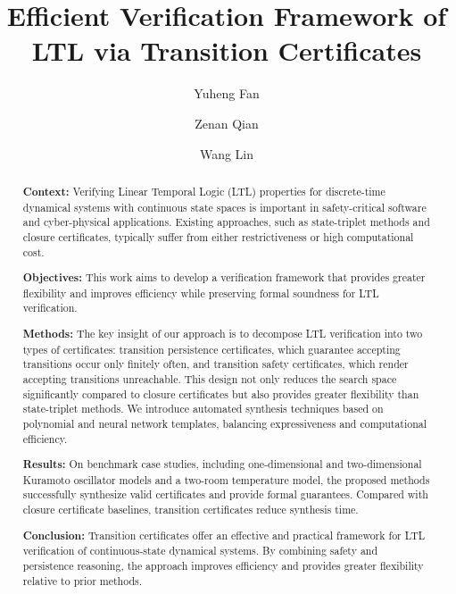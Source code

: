 ﻿\documentclass[a4paper,fleqn]{cas-sc}
\theoremstyle{definition}
\begin{document}
\let\WriteBookmarks\relax
\def\floatpagepagefraction{1}
\def\textpagefraction{.001}


\title[mode=title]{Efficient Verification Framework of LTL via Transition Certificates}

\author{Yuheng Fan}
\author{Zenan Qian}
\author{Wang Lin}
\cormark[1]



\begin{abstract}
\noindent\textbf{Context:} Verifying Linear Temporal Logic (LTL) properties for discrete-time dynamical systems with continuous state spaces is important in safety-critical software and cyber-physical applications. Existing approaches, such as state-triplet methods and closure certificates, typically suffer from either restrictiveness or high computational cost.\par
\noindent\textbf{Objectives:} This work aims to develop a verification framework that provides greater flexibility and improves efficiency while preserving formal soundness for LTL verification.\par
\noindent\textbf{Methods:} The key insight of our approach is to decompose LTL verification into two types of certificates: transition persistence certificates, which guarantee accepting transitions occur only finitely often, and transition safety certificates, which render accepting transitions unreachable. This design not only reduces the search space significantly compared to closure certificates but also provides greater flexibility than state-triplet methods. We introduce automated synthesis techniques based on polynomial and neural network templates, balancing expressiveness and computational efficiency.\par
\noindent\textbf{Results:} On benchmark case studies, including one-dimensional and two-dimensional Kuramoto oscillator models and a two-room temperature model, the proposed methods successfully synthesize valid certificates and provide formal guarantees. Compared with closure certificate baselines, transition certificates reduce synthesis time.\par
\noindent\textbf{Conclusion:} Transition certificates offer an effective and practical framework for LTL verification of continuous-state dynamical systems. By combining safety and persistence reasoning, the approach improves efficiency and provides greater flexibility relative to prior methods.
\end{abstract}
\end{document}
